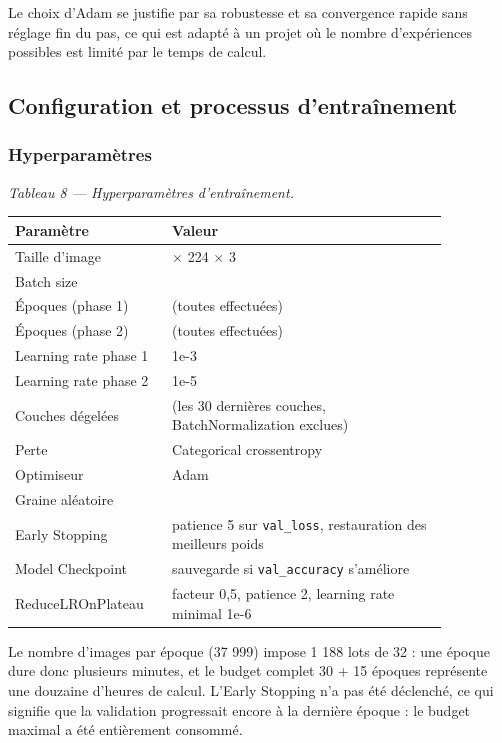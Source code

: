 \documentclass[10pt,a4paper]{article}
\begin{document}
Le choix d'Adam se justifie par sa robustesse et sa convergence rapide sans réglage fin du pas, ce qui est adapté à un projet où le nombre d'expériences possibles est limité par le temps de calcul.

\subsection{Configuration et processus d'entraînement}

\subsubsection{Hyperparamètres}

\begin{center}\small\itshape Tableau 8 --- Hyperparamètres d'entraînement.\end{center}
{\footnotesize
\begin{longtable}{@{}>{\raggedright\arraybackslash}p{0.28\linewidth}>{\raggedright\arraybackslash}p{0.58\linewidth}@{}}
\toprule
\textbf{Paramètre} & \textbf{Valeur} \\
\midrule
\endhead
\bottomrule
\endlastfoot
Taille d'image & 224 $\times$ 224 $\times$ 3 \\
Batch size & 32 \\
Époques (phase 1) & 30 (toutes effectuées) \\
Époques (phase 2) & 15 (toutes effectuées) \\
Learning rate phase 1 & 1e-3 \\
Learning rate phase 2 & 1e-5 \\
Couches dégelées & 19 (les 30 dernières couches, BatchNormalization exclues) \\
Perte & Categorical crossentropy \\
Optimiseur & Adam \\
Graine aléatoire & 42 \\
Early Stopping & patience 5 sur \texttt{val\_\allowbreak{}loss}, restauration des meilleurs poids \\
Model Checkpoint & sauvegarde si \texttt{val\_\allowbreak{}accuracy} s'améliore \\
ReduceLROnPlateau & facteur 0,5, patience 2, learning rate minimal 1e-6 \\
\end{longtable}
}

Le nombre d'images par époque (37 999) impose 1 188 lots de 32 : une époque dure donc plusieurs minutes, et le budget complet 30 + 15 époques représente une douzaine d'heures de calcul. L'Early Stopping n'a pas été déclenché, ce qui signifie que la validation progressait encore à la dernière époque : le budget maximal a été entièrement consommé.
\end{document}
